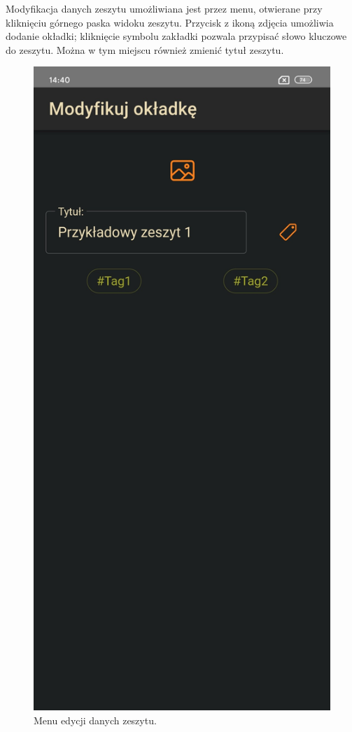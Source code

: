 Modyfikacja danych zeszytu umożliwiana jest przez menu, otwierane przy kliknięciu górnego paska widoku zeszytu.
Przycisk z ikoną zdjęcia umożliwia dodanie okładki; kliknięcie symbolu zakładki pozwala przypisać słowo kluczowe
do zeszytu. Można w tym miejscu również zmienić tytuł zeszytu.
\begin{figure}[H]
	\begin{center}
		\includegraphics[scale=0.2]{media/BookMenu.jpg}
	\end{center}
	\caption{Menu edycji danych zeszytu.}
	\label{rys:book-menu}
\end{figure}

